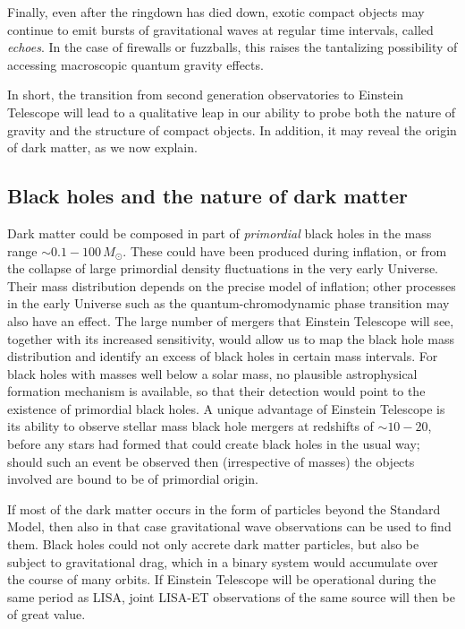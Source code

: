 Finally, even after the ringdown has died down, exotic compact objects may continue to 
emit bursts of gravitational waves at regular time intervals, called \emph{echoes}. 
In the case of firewalls or fuzzballs, this raises the tantalizing possibility of accessing 
macroscopic quantum gravity effects. 

In short, the transition from second generation observatories to Einstein Telescope
will lead to a qualitative leap in our ability to probe both the nature of gravity
and the structure of compact objects. In addition, it may reveal the origin of dark matter, 
as we now explain.

\subsection{Black holes and the nature of dark matter}

Dark matter could be composed in part of \emph{primordial} black holes in the mass range $\sim 0.1 - 100\,M_\odot$.
These could have been produced during inflation, or from the collapse of large primordial density 
fluctuations in the very early Universe. Their mass distribution depends on the precise model 
of inflation; other processes in the early Universe such as the quantum-chromodynamic phase 
transition may also have an effect. The large number of mergers that Einstein Telescope
will see, together with its increased sensitivity, would allow us to map the black hole mass distribution
and identify an excess of black holes in certain mass intervals. For black holes with masses well below a 
solar mass, no plausible astrophysical formation mechanism is available, so that their detection would
point to the existence of primordial black holes. 
A unique advantage of Einstein Telescope
is its ability to observe stellar mass black hole mergers at redshifts of $\sim 10-20$, before
any stars had formed that could create black holes in the usual way; 
should such an event be observed then (irrespective of masses) 
the objects involved are bound to be of primordial origin.

If most of the dark matter occurs in the form of particles beyond the Standard Model, 
then also in that case gravitational wave observations can be used to find them. Black holes
could not only accrete dark matter particles, but also be subject to gravitational drag, which 
in a binary system would accumulate over the course of many orbits. If Einstein 
Telescope will be operational during the same period as LISA, joint LISA-ET observations
of the same source will then be of great value.

